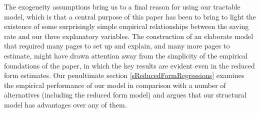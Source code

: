 
The exogeneity assumptions bring us to a final reason for using our tractable model, which is that a central purpose of this paper has been to bring to light the existence of some surprisingly simple empirical relationships between the saving rate and our three explanatory variables.  The construction of an elaborate model that required many pages to set up and explain, and many more pages to estimate, might have drawn attention away from the simplicity of the empirical foundations of the paper, in which the key results are evident even in the reduced form estimates.  Our penultimate section \ref{sReducedFormRegressions} examines the empirical performance of our model in comparison with a number of alternatives (including the reduced form model) and argues that our structural model has advantages over any of them.
